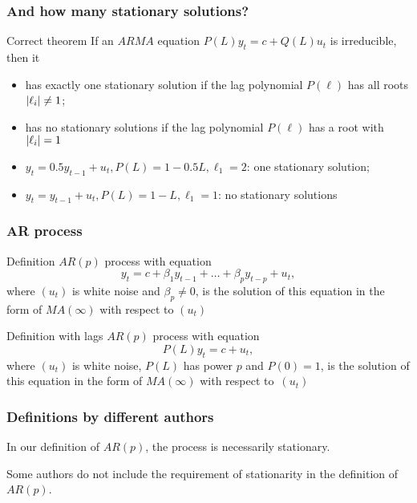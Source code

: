 \begin{frame}
	\frametitle{And how many stationary solutions?}
	
	\begin{block}{Correct theorem}
		If an $ARMA$ equation $P(L) y_t = c + Q(L) u_t$ is irreducible, then it
		\begin{itemize}
			\item has exactly one stationary solution if the lag polynomial $P(\ell)$ has all roots $\abs{\ell_i} \neq 1$;
			\item has no stationary solutions if the lag polynomial $P(\ell)$ has a root with $\abs{\ell_i} = 1$
		\end{itemize}
	\end{block}
	
	\pause
	\begin{itemize}
		\item $y_t = 0.5 y_{t-1} + u_t, P(L) = 1 - 0.5L, \ell_1 = 2$: \pause one stationary solution;
	\end{itemize}
	\pause
	\begin{itemize}
		\item $y_t = y_{t-1} + u_t, P(L) = 1 - L, \ell_1 = 1$: no stationary solutions
	\end{itemize}
	
\end{frame}



\begin{frame}
	\frametitle{AR process}
	
	\begin{block}{Definition}
		$AR(p)$ process with equation
		\[
		y_t = c + \beta_1 y_{t-1} + \ldots + \beta_p y_{t-p} + u_t,
		\]
		where $(u_t)$ is white noise and $\beta_p \neq 0$, is the
		solution of this equation in  the form of $MA(\infty)$ with respect to $(u_t)$
	\end{block}
	
	\pause
	\begin{block}{Definition with lags}
		$AR(p)$ process with equation
		\[
		P(L)y_t = c + u_t,
		\]
		where $(u_t)$ is white noise, $P(L)$ has power $p$ and $P(0)=1$, is the 
		solution of this equation in the form of $MA(\infty)$ with respect to~$(u_t)$
	\end{block}
	
\end{frame}

\begin{frame}
	\frametitle{Definitions by different authors}
	


	In our definition of $AR(p)$, the process is necessarily \alert{stationary}.
	
	\pause
	Some  authors \alert{do not include}  the requirement of stationarity in the definition of $AR(p)$.
	
\end{frame}

